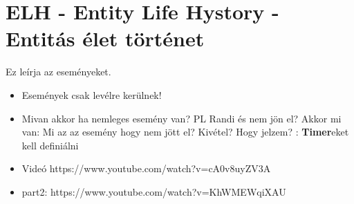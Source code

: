 \section{ELH - Entity Life Hystory - Entitás élet történet}

Ez leírja az eseményeket.

\begin{itemize}
	\item Események csak levélre kerülnek!
	\item Mivan akkor ha nemleges esemény van? PL Randi és nem jön el? Akkor mi van: Mi az az esemény hogy nem jött el? Kivétel? Hogy jelzem? : \textbf{Timer}eket kell definiálni

	\item Videó https://www.youtube.com/watch?v=cA0v8uyZV3A
	\item part2: https://www.youtube.com/watch?v=KhWMEWqiXAU
\end{itemize}
